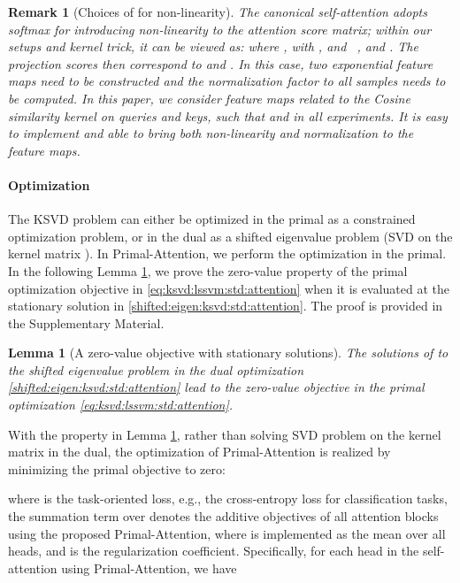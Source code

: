 \documentclass{article}
\newtheorem{lemma}[theorem]{Lemma}
\newtheorem{remark}[theorem]{Remark}
\begin{document}
\begin{remark}[Choices of   for non-linearity]\label{rkm::feat_maps}
	The canonical self-attention {adopts softmax for introducing non-linearity to the  attention score matrix}; {within our setups and kernel trick,} it can be viewed as:  
	where 
	,  with
	,
	 and 
	~\cite{choromanski2021rethinking},
	and .
	The projection scores then correspond to 
	 and
	.
	In this case, two exponential feature maps need to be constructed and the normalization factor  to all samples needs to be computed.
	In this paper, we consider feature maps related to the Cosine similarity kernel on queries and keys, such that
	 and 
	 in all experiments. 
	It is easy to implement and able to bring both non-linearity and normalization to the feature maps.
\end{remark}



\paragraph{Optimization}
The KSVD problem can either be optimized in the primal as a constrained optimization problem, or in the dual as a shifted eigenvalue problem (SVD on the kernel matrix ).  
In Primal-Attention, we perform the optimization in the primal.
In the following Lemma \ref{prop:obj:0}, we prove the {zero-value} property of the primal optimization objective  in  \eqref{eq:ksvd:lssvm:std:attention} when it is evaluated at the stationary solution in \eqref{shifted:eigen:ksvd:std:attention}. 
The proof is provided in the Supplementary Material.

\begin{lemma}[A {zero-value} objective with stationary solutions]\label{prop:obj:0}
	The solutions of  to the shifted eigenvalue problem in the dual optimization \eqref{shifted:eigen:ksvd:std:attention} lead to the  {zero-value} objective  in the primal optimization \eqref{eq:ksvd:lssvm:std:attention}.
\end{lemma}


With the property in Lemma \ref{prop:obj:0}, rather than solving SVD problem on the kernel matrix  in the dual, the optimization of Primal-Attention is realized by minimizing the primal objective to zero:

where  is the task-oriented loss, e.g., the cross-entropy loss for classification tasks, the summation term over  denotes the additive objectives  of all attention blocks using the proposed Primal-Attention, {where  is implemented as the mean over all heads,} {and {} is the regularization coefficient.}
Specifically, for each head in the self-attention using Primal-Attention, we have
\end{document}
